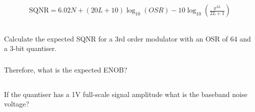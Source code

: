 \section{}

\begin{align}
    \text{SQNR} = 6.02N + (20L + 10)\log_10(OSR) - 10\log_{10}\left(\frac{\pi^{2L}}{2L+1}\right)
\end{align}

    \subsection{}
    Calculate the expected SQNR for a 3rd order modulator with an OSR of 64 and a 3-bit quantiser.

        \subsubsection{}

        Therefore, what is the expected ENOB?


    \subsection{}
    If the quantiser has a 1V full-scale signal amplitude what is the baseband noise voltage?

    \subsection{}


